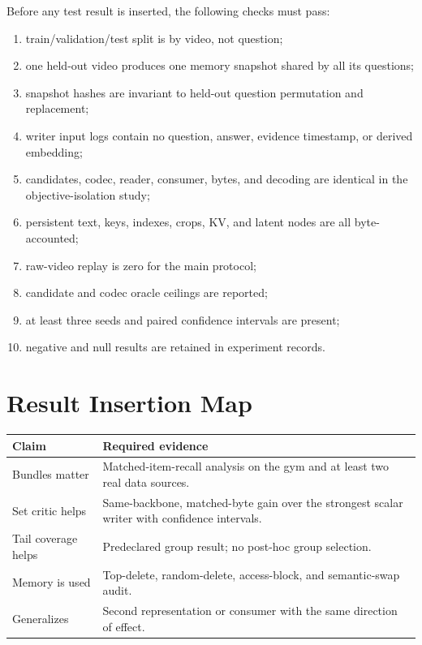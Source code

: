\documentclass[10pt,twocolumn,letterpaper]{article}
\begin{document}
Before any test result is inserted, the following checks must pass:
\begin{enumerate}[leftmargin=*,itemsep=1pt]
    \item train/validation/test split is by video, not question;
    \item one held-out video produces one memory snapshot shared by all its questions;
    \item snapshot hashes are invariant to held-out question permutation and replacement;
    \item writer input logs contain no question, answer, evidence timestamp, or derived embedding;
    \item candidates, codec, reader, consumer, bytes, and decoding are identical in the objective-isolation study;
    \item persistent text, keys, indexes, crops, KV, and latent nodes are all byte-accounted;
    \item raw-video replay is zero for the main protocol;
    \item candidate and codec oracle ceilings are reported;
    \item at least three seeds and paired confidence intervals are present;
    \item negative and null results are retained in experiment records.
\end{enumerate}

\section{Result Insertion Map}
\label{app:resultsmap}

\begin{center}
\label{tab:insertion-map}
\small
\begin{tabularx}{\columnwidth}{p{}X}
\toprule
Claim & Required evidence \\
\midrule
Bundles matter & Matched-item-recall analysis on the gym and at least two real data sources. \\
Set critic helps & Same-backbone, matched-byte gain over the strongest scalar writer with confidence intervals. \\
Tail coverage helps & Predeclared group result; no post-hoc group selection. \\
Memory is used & Top-delete, random-delete, access-block, and semantic-swap audit. \\
Generalizes & Second representation or consumer with the same direction of effect. \\
\bottomrule
\end{tabularx}
\end{center}
\end{document}
